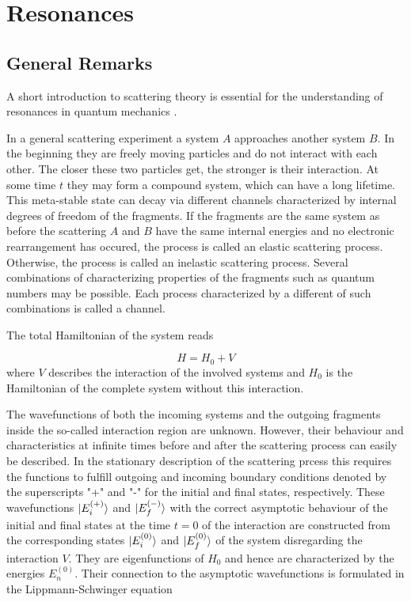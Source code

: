 \chapter{Resonances}
\label{chapter:resonances}

\section{General Remarks}
A short introduction to scattering theory is essential for the understanding
of resonances in quantum mechanics \cite{nolting52,Gell-Mann53,Taylor87}.

In a general scattering experiment a system $A$ approaches another
system $B$. In the beginning they are freely moving particles and do not interact
with each other. The closer these two particles get, the stronger is their interaction.
At some time $t$ they may form a compound system, which can have a long lifetime.
This meta-stable state can decay via different channels characterized
by internal degrees of freedom of the fragments. If the fragments are the
same system as before the scattering $A$ and $B$ have the same internal
energies and no electronic rearrangement
has occured, the process is called an elastic scattering process.
Otherwise, the process is called an inelastic scattering process.
Several combinations of characterizing properties of the fragments such as
quantum numbers may be possible. Each process characterized by a different
of such combinations is called a channel.

The total Hamiltonian of the system reads

\begin{equation}
 H = H_0 + V
\end{equation}
where $V$ describes the interaction of the involved systems and
$H_0$ is the Hamiltonian of the complete system without this interaction.

The wavefunctions of both the incoming systems and the outgoing
fragments inside the so-called interaction region are unknown.
However, their behaviour and characteristics at infinite times before
and after the scattering process can easily be described.
In the stationary description of the scattering prcess this requires
the functions to fulfill outgoing and incoming boundary conditions
denoted by the superscripts "+" and "-" for the initial and final states,
respectively.
These wavefunctions $\ket{E_i^{(+)}}$ and $\ket{E_f^{(-)}}$ with the correct
asymptotic behaviour
of the initial and final states at the time $t=0$ of the interaction
are constructed from the corresponding states $\ket{E_i^{(0)}}$ and
$\ket{E_f^{(0)}}$ of the system disregarding the interaction $V$.
They are eigenfunctions of $H_0$ and hence
are characterized by the energies $E_n^{(0)}$.
Their connection to the asymptotic wavefunctions is
formulated in the Lippmann-Schwinger equation

